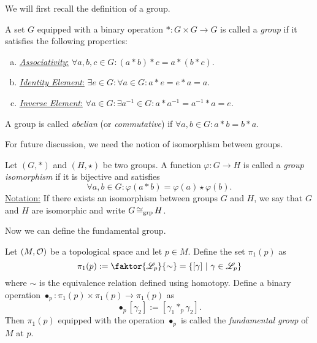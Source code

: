 We will first recall the definition of a group.
\begin{definition}[Group]\label{def:group}
	A set \(G\) equipped with a binary operation \(\ast: G \times G \to G\) is called a \emph{group} if it satisfies the following properties:
	\begin{enumerate}[(a)]
		\item \uline{\emph{Associativity}:} \(\forall a, b, c \in G: (a \ast b) \ast c = a \ast (b \ast c)\).
		\item \uline{\emph{Identity Element}:} \(\exists e \in G: \forall a \in G: a \ast e = e \ast a = a\).
		\item \uline{\emph{Inverse Element}:} \(\forall a \in G: \exists a^{-1} \in G: a \ast a^{-1} = a^{-1} \ast a = e\).
	\end{enumerate}
	A group is called \emph{abelian} (or \emph{commutative}) if \(\forall a, b \in G: a \ast b = b \ast a\).
\end{definition}
For future discussion, we need the notion of isomorphism between groups.
\begin{definition}\label{def:group_isomorphism}
	Let \((G, \ast)\) and \((H, \star)\) be two groups. A function \(\varphi: G \to H\) is called a \emph{group isomorphism} if it is bijective and satisfies
	\begin{equation}
		\forall a, b \in G: \varphi(a \ast b) = \varphi(a) \star \varphi(b). \label{eq:group_isomorphism}
	\end{equation}
	\uline{Notation:} If there exists an isomorphism between groups \(G\) and \(H\), we say that \(G\) and \(H\) are isomorphic and write \(G \operatorname{\cong_{\text{grp}}} H\).
\end{definition}

Now we can define the fundamental group.
\begin{definition}\label{def:fundamental_group}
	Let \((M, \mathcal{O})\) be a topological space and let \(p \in M\). Define the set \(\pi_1(p)\) as
	\begin{equation}
		\pi_1(p) := \faktor{\mathscr{L}_p}{\sim} = \qty{[\gamma] \mid \gamma \in \mathscr{L}_p} \label{eq:fundamental_group_set}
	\end{equation}
	where \(\sim\) is the equivalence relation defined using homotopy. Define a binary operation \(\bullet_p: \pi_1(p) \times \pi_1(p) \to \pi_1(p)\) as
	\begin{equation}
		[\gamma_1] \bullet_p [\gamma_2] := [\gamma_1 \ast_p \gamma_2]. \label{eq:fundamental_group_operation}
	\end{equation}
	Then \(\pi_1(p)\) equipped with the operation \(\bullet_p\) is called the \emph{fundamental group} of \(M\) at \(p\).
\end{definition}

